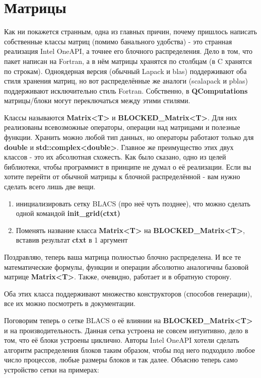 \documentclass[12pt,fleqn]{article}
\begin{document}
        \section{Матрицы}
        Как ни покажется странным, одна из главных причин, почему пришлось написать собственные классы матриц (помимо банального удобства) - это странная реализация \textsf{Intel OneAPI},
        а точнее его блочного распределения. Дело в том, что пакет написан на Fortran, а в нём 
        матрицы хранятся по столбцам (в C хранятся по строкам). Одноядерная версия (обычный Lapack и blas) поддерживают оба стиля хранения матриц, но вот распределённые же аналоги (scalapack и 
        pblas) поддерживают исключительно стиль Fortran. Собственно, в \textbf{QComputations} матрицы/блоки могут переключаться между этими стилями.

        Классы называются \textbf{Matrix<T>} и \textbf{BLOCKED\_Matrix<T>}. Для них реализованы всевозможные операторы, операции над матрицами и полезные функции. 
        Хранить можно любой тип данных, но операторы работают только для \textbf{double} и \textbf{std::complex<double>}. 
        Главное же преимущество этих двух классов - это их абсолютная схожесть. Как было сказано, одно из 
        целей библиотеки, чтобы программист в принципе не думал о её реализации. Если вы хотите перейти от обычной матрицы к блочной распределённой - вам нужно сделать всего лишь две вещи.

        \begin{enumerate}
            \item{инициализировать сетку \textsf{BLACS} (про неё чуть позднее), что можно сделать одной командой \textbf{init\_grid(ctxt)}}
            \item{Поменять название класса \textbf{Matrix<T>} на \textbf{BLOCKED\_Matrix<T>}, вставив результат \textbf{ctxt} в 1 аргумент}
        \end{enumerate}

        Поздравляю, теперь ваша матрица полностью блочно распределена. И все те математические формулы, функции и операции абсолютно аналогичны базовой матрице \textbf{Matrix<T>}.
        Также, очевидно, работает и в обратную сторону.

        Оба этих класса поддерживают множество конструкторов (способов генерации), все их можно посмотреть в документации.

        Поговорим теперь о сетке \textsf{BLACS} о её влиянии на \textbf{BLOCKED\_Matrix<T>} и на производительность.
        Данная сетка устроена не совсем интуитивно, дело в том, что её блоки устроены циклично. Авторы \textsf{Intel OneAPI} хотели сделать алгоритм распределения блоков таким образом,
         чтобы под него подходило любое число процессов, любые размеры блоков и так далее. Объясню теперь само устройство сетки на примерах:
\end{document}
